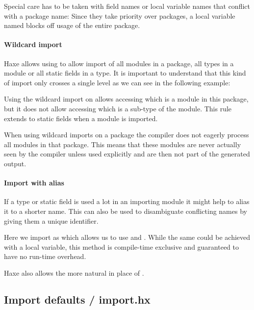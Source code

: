 
Special care has to be taken with field names or local variable names that conflict with a package name: Since they take priority over packages, a local variable named  blocks off usage of the entire  package.

\paragraph{Wildcard import}

Haxe allows using  to allow import of all modules in a package, all types in a module or all static fields in a type. It is important to understand that this kind of import only crosses a single level as we can see in the following example:


Using the wildcard import on  allows accessing  which is a module in this package, but it does not allow accessing  which is a sub-type of the  module. This rule extends to static fields when a module is imported.

When using wildcard imports on a package the compiler does not eagerly process all modules in that package. This means that these modules are never actually seen by the compiler unless used explicitly and are then not part of the generated output.

\paragraph{Import with alias}

If a type or static field is used a lot in an importing module it might help to alias it to a shorter name. This can also be used to disambiguate conflicting names by giving them a unique identifier.


Here we import  as  which allows us to use  and . While the same could be achieved with a local variable, this method is compile-time exclusive and guaranteed to have no run-time overhead.


Haxe also allows the more natural  in place of .

\subsection{Import defaults / import.hx}
\label{type-system-import-defaults}

